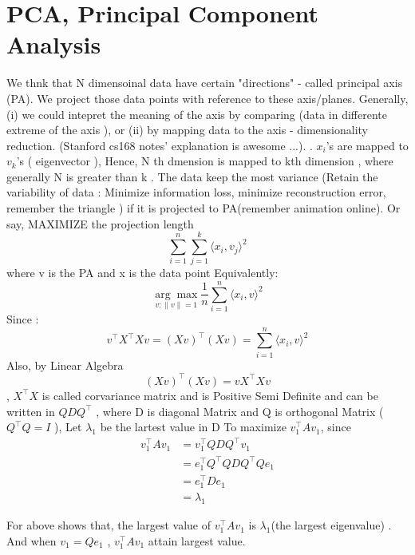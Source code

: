 \documentclass{article}
\begin{document}
\section{PCA, Principal Component Analysis}
We thnk that N dimensoinal data have certain "directions" - called principal axis (PA). We project those data points with reference to these axis/planes. \newline 
Generally, (i) we could intepret the meaning of the axis by comparing (data in differente  extreme of  the axis ), or  (ii) by mapping data to the axis - dimensionality reduction.\newline
(Stanford cs168 notes' explanation is awesome ...). . \(x_i\)'s are mapped to \(v_k\)'s ( eigenvector ), Hence, N th dmension is mapped to kth dimension , where generally N is greater than k . The data keep the most variance (Retain the variability of data : Minimize information loss, minimize reconstruction error, remember the triangle ) if it is projected to PA(remember animation online). Or say, MAXIMIZE the projection length \newline 
\[ \sum_{i=1}^{n} \sum_{j=1}^{k} \langle x_i, v_j \rangle^2 \]
where v is the PA and x is the data point\newline
Equivalently:
\[ \underset{v : \|v\| = 1}{\arg\max} \frac{1}{n} \sum_{i=1}^{n} \langle x_i, v \rangle^2 \]
Since : 
\[ v^\top X^\top X v = (Xv)^\top (Xv) = \sum_{i=1}^{n} \langle x_i, v \rangle^2 \]
Also, by  Linear Algebra 
\[(Xv)^\top (Xv)  = vX^\top Xv\] , \(X^\top X\) is called corvariance matrix and is Positive Semi Definite and  can be written in \(QDQ^\top\) , where D is diagonal Matrix and Q is orthogonal Matrix ( \(Q^\top Q = I\) ), \newline
Let \(\lambda_1\)  be the lartest value in D \newline
To maximize \(v^\top_1 A v_1\), since 
\begin{align*}
v^\top_1 A v_1 &= v^\top_1 Q D Q^\top v_1 \\
&= e^\top_1 Q^\top Q D Q^\top Q e_1 \\
&= e^\top_1 D e_1 \\
&= \lambda_1
\end{align*}

For above shows that, the largest value of  \(v^\top_1 A v_1\) is \(\lambda_1\)(the largest eigenvalue) . And when \(v_1 = Qe_1\) , \(v^\top_1 A v_1\) attain largest value.  \newline 
\end{document}
